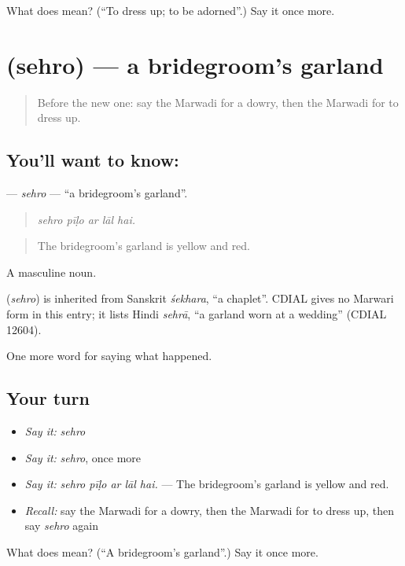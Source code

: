 \begin{tcolorbox}[breakable,colback=teal!4,colframe=teal!35!black,title={Before you move on}]
What does  mean? (\textquotedblleft{}To dress up; to be adorned\textquotedblright{}.) Say it once more.
\end{tcolorbox}
\section[\texorpdfstring{\mw{सेहरो} (sehro)}{सेहरो (sehro)}]{ (sehro) — a bridegroom's garland}

\label{lesson:MW-C248-sehro}



\begin{quote}
Before the new one: say the Marwadi for a dowry, then the Marwadi for to dress up.
\end{quote}

\subsection*{You'll want to know: }
\textbf{} — \emph{sehro} — \textquotedblleft{}a bridegroom's garland\textquotedblright{}.

\begin{quote}
    
\end{quote}

\begin{quote}
\emph{sehro pīḷo ar lāl hai.}
\end{quote}

\begin{quote}
The bridegroom's garland is yellow and red.
\end{quote}

A masculine noun.

\begin{cousinweb}
\textbf{} (\emph{sehro}) is inherited from Sanskrit \emph{śekhara}, \textquotedblleft{}a chaplet\textquotedblright{}. CDIAL gives no Marwari form in this entry; it lists Hindi \emph{sehrā}, \textquotedblleft{}a garland worn at a wedding\textquotedblright{} (CDIAL 12604).
\end{cousinweb}

\begin{grammarlens}[title={What you've built}]
One more word for saying what happened.
\end{grammarlens}

\subsection*{Your turn}
\begin{itemize}
\raggedright
  \item \emph{Say it:} \emph{sehro}
  \item \emph{Say it:} \emph{sehro}, once more
  \item \emph{Say it:} \emph{sehro pīḷo ar lāl hai.} — The bridegroom's garland is yellow and red.
  \item \emph{Recall:} say the Marwadi for a dowry, then the Marwadi for to dress up, then say \emph{sehro} again
\end{itemize}

\begin{tcolorbox}[breakable,colback=teal!4,colframe=teal!35!black,title={Before you move on}]
What does  mean? (\textquotedblleft{}A bridegroom's garland\textquotedblright{}.) Say it once more.
\end{tcolorbox}
